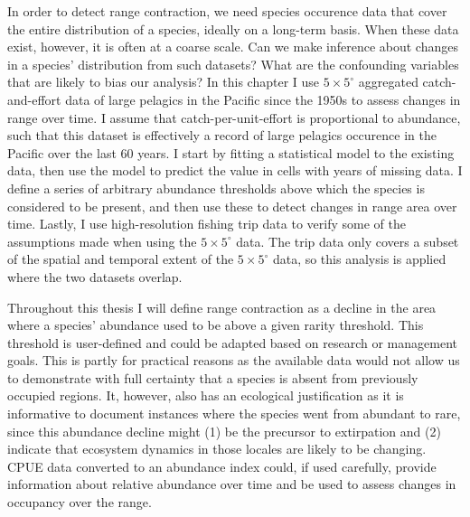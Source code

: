 \documentclass{article}
\newcommand{\griddef}[2]{$#1 \times #2^\circ$}
\begin{document}
In order to detect range contraction, we need species occurence data that cover the entire
distribution of a species, ideally on a long-term basis. When
these data exist, however, it is often at a coarse scale. Can we make inference
about changes in a species' distribution from such datasets? What are
the confounding variables that are likely to bias our analysis? In
this chapter I use \griddef{5}{5} aggregated catch-and-effort
data of large pelagics in the Pacific since the
1950s to assess changes in range over time. I assume that catch-per-unit-effort is proportional to
abundance, such that this dataset is effectively a record of large pelagics
occurence in the Pacific over the last 60 years. I start by fitting a statistical model to the existing
data, then use the model to predict the value in cells with years of
missing data. I define a series of arbitrary abundance thresholds above
which the species is considered to be present, and then use these to
detect changes in range area over time. Lastly, I use high-resolution
fishing trip data to verify some of the assumptions made when using
the \griddef{5}{5} data. The trip data only covers a subset of the spatial
and temporal extent of the \griddef{5}{5} data, so this analysis is
applied where the two datasets overlap.


Throughout this thesis I will define range contraction as a decline
in the area where a species' abundance used to be above a given
rarity threshold. This threshold is user-defined and could be adapted
based on research or management goals. This is partly for
practical reasons as the available data would not allow us to demonstrate
with full certainty that a species is absent from previously occupied
regions. It, however, also has an ecological justification as it is
informative to document instances where the
species went from abundant to rare, since this abundance decline might
(1) be the precursor to extirpation and (2) indicate that ecosystem
dynamics in those locales are likely to be changing. CPUE data
converted to an abundance index could, if used carefully, provide
information about relative abundance over time and be used to assess
changes in occupancy over the range.
\end{document}
